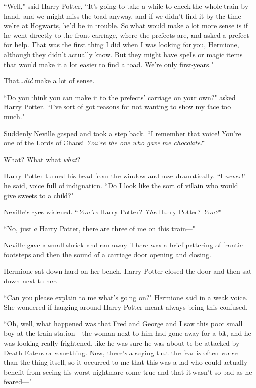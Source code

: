 ``Well," said Harry Potter, ``It's going to take a while to check the whole train by hand, and we might miss the toad anyway, and if we didn't find it by the time we're at Hogwarts, he'd be in trouble. So what would make a lot more sense is if he went directly to the front carriage, where the prefects are, and asked a prefect for help. That was the first thing I did when I was looking for you, Hermione, although they didn't actually know. But they might have spells or magic items that would make it a lot easier to find a toad. We're only first-years."

That…\emph{did} make a lot of sense.

``Do you think you can make it to the prefects' carriage on your own?" asked Harry Potter. ``I've sort of got reasons for not wanting to show my face too much."

Suddenly Neville gasped and took a step back. ``I remember that voice! You're one of the Lords of Chaos! \emph{You're the one who gave me chocolate!}"

What? What what \emph{what}?

Harry Potter turned his head from the window and rose dramatically. ``I \emph{never}!" he said, voice full of indignation. ``Do I look like the sort of villain who would give sweets to a child?"

Neville's eyes widened. ``\emph{You're} Harry Potter? \emph{The} Harry Potter? \emph{You?}"

``No, just \emph{a} Harry Potter, there are three of me on this train—"

Neville gave a small shriek and ran away. There was a brief pattering of frantic footsteps and then the sound of a carriage door opening and closing.

Hermione sat down hard on her bench. Harry Potter closed the door and then sat down next to her.

``Can you please explain to me what's going on?" Hermione said in a weak voice. She wondered if hanging around Harry Potter meant always being this confused.

``Oh, well, what happened was that Fred and George and I saw this poor small boy at the train station—the woman next to him had gone away for a bit, and he was looking really frightened, like he was sure he was about to be attacked by Death Eaters or something. Now, there's a saying that the fear is often worse than the thing itself, so it occurred to me that this was a lad who could actually benefit from seeing his worst nightmare come true and that it wasn't so bad as he feared—"

